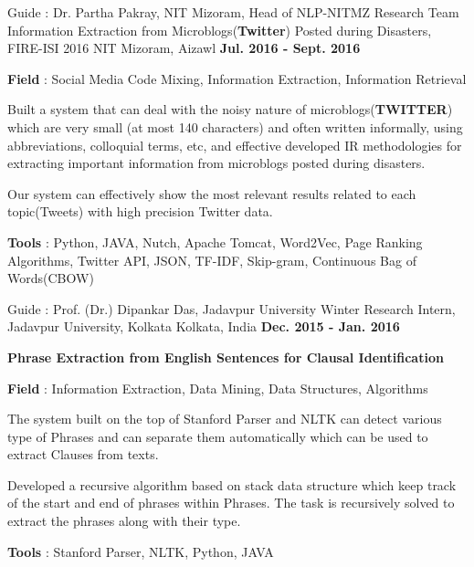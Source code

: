 \begin{cventries}
  \cventry
    {Guide : Dr. Partha Pakray, NIT Mizoram, Head of NLP-NITMZ Research Team}
    {Information Extraction from Microblogs(\textbf{Twitter}) Posted during Disasters, FIRE-ISI 2016}
    {NIT Mizoram, Aizawl}
    {\textbf{Jul. 2016 - Sept. 2016}}
    {
      \begin{cvitems}
        \item{\textbf{Field} : Social Media Code Mixing, Information Extraction, Information Retrieval}
        \item{Built a system that can deal with the noisy nature of microblogs(\textbf{TWITTER}) which are very small (at most 140 characters) and often written informally, using abbreviations, colloquial terms, etc, and 
effective developed IR methodologies for extracting important information from microblogs posted during disasters.}
        \item{Our system can effectively show the most relevant results related to each topic(Tweets) with high precision Twitter data.}
        \item{\textbf{Tools} : Python, JAVA, Nutch, Apache Tomcat, Word2Vec, Page Ranking Algorithms, Twitter API, JSON, TF-IDF, Skip-gram, Continuous Bag of Words(CBOW)}
      \end{cvitems} 
    }
    \cventry
    {Guide : Prof. (Dr.) Dipankar Das, Jadavpur University}
    {Winter Research Intern, Jadavpur University, Kolkata}
    {Kolkata, India}
    {\textbf{Dec. 2015 - Jan. 2016}}
    {
      \begin{cvitems}
        \item\textbf {Phrase Extraction from English Sentences for Clausal Identification} 
        \item{\textbf{Field} : Information Extraction, Data Mining, Data Structures, Algorithms}
        \item{The system built on the top of Stanford Parser and NLTK can detect various type of Phrases and
 can separate them automatically which can be used to extract Clauses from texts.}
        \item{Developed a recursive algorithm
 based on stack data structure which keep track of the start and end of phrases within Phrases. The task
 is recursively solved to extract the phrases along with their type.}
        \item {\textbf{Tools} : Stanford Parser, NLTK, Python, JAVA}
      \end{cvitems}
    }
\end{cventries}  

